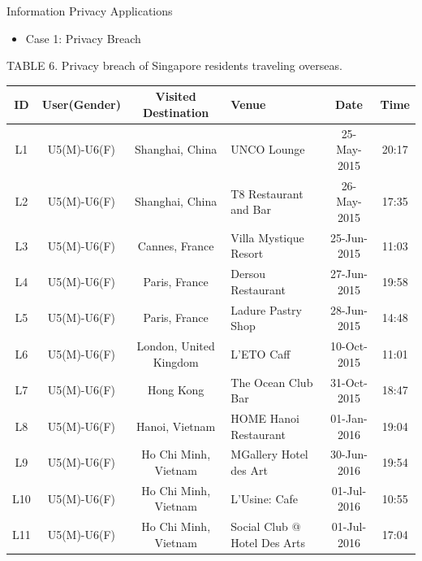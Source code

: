 \documentclass[
 size=14pt,
 paper=smartboard,  %
 mode=present, 		%
 display=slides, 	%
 style=tuliplab,  	%
 pauseslide,
 fleqn,leqno]{powerdot}
\begin{document}


\begin{slide}[toc=,bm=]{Information Privacy Applications}
\begin{itemize}
\item
Case 1: Privacy Breach
\end{itemize}
\begin{table}
	\fontsize{11pt}{11pt}\selectfont
	\setlength{\abovecaptionskip}{0pt}
	\setlength{\belowcaptionskip}{12pt}
	\centering
	\item
	TABLE 6. Privacy breach of Singapore residents traveling overseas\protect\footnotemark[1].\\[15pt]
	\begin{tabular}{c|c|c|l|c|c}	
	\toprule
	ID  				&  	\textbf{User(Gender)}		& 		\textbf{Visited Destination} 		& 		\textbf{Venue} 		& 	\textbf{Date} 		&	\textbf{Time}	\\
	\midrule
	L{\footnotesize1}	&	U{\footnotesize5}(M)-U{\footnotesize6}(F)	&	Shanghai, China 	&	UNCO Lounge				&	25-May-2015	&	20:17\\
	L{\footnotesize2}	&	U{\footnotesize5}(M)-U{\footnotesize6}(F)	&	Shanghai, China 	&	T8 Restaurant and Bar		&	26-May-2015	&	17:35\\
	L{\footnotesize3}	&	U{\footnotesize5}(M)-U{\footnotesize6}(F)	&	Cannes, France 	&	Villa Mystique Resort		&	25-Jun-2015	&	11:03\\
	L{\footnotesize4}	&	U{\footnotesize5}(M)-U{\footnotesize6}(F)	&	Paris, France 		&	Dersou Restaurant			&	27-Jun-2015	&	19:58\\
	L{\footnotesize5}	&	U{\footnotesize5}(M)-U{\footnotesize6}(F)	&	Paris, France 		&	Ladure Pastry Shop			&	28-Jun-2015	&	14:48\\
	L{\footnotesize6}	&	U{\footnotesize5}(M)-U{\footnotesize6}(F)	&	London, United Kingdom 		&	L'ETO Caff			&	10-Oct-2015	&	11:01\\
	L{\footnotesize7}	&	U{\footnotesize5}(M)-U{\footnotesize6}(F)	&	Hong Kong		&	The Ocean Club Bar			&	31-Oct-2015	&	18:47\\
	L{\footnotesize8}	&	U{\footnotesize5}(M)-U{\footnotesize6}(F)	&	Hanoi, Vietnam		&	HOME Hanoi Restaurant			&	01-Jan-2016	&	19:04\\
	L{\footnotesize9}	&	U{\footnotesize5}(M)-U{\footnotesize6}(F)	&	Ho Chi Minh, Vietnam		&	MGallery Hotel des Art		&	30-Jun-2016	&	19:54\\
	L{\footnotesize10}	&	U{\footnotesize5}(M)-U{\footnotesize6}(F)	&	Ho Chi Minh, Vietnam		&	L'Usine: Cafe		&	01-Jul-2016	&	10:55\\
	L{\footnotesize11}	&	U{\footnotesize5}(M)-U{\footnotesize6}(F)	&	Ho Chi Minh, Vietnam		&	Social Club @ Hotel Des Arts		&	01-Jul-2016	&	17:04\\
	\bottomrule
	\end{tabular}
\end{table}


\end{slide}
\end{document}
